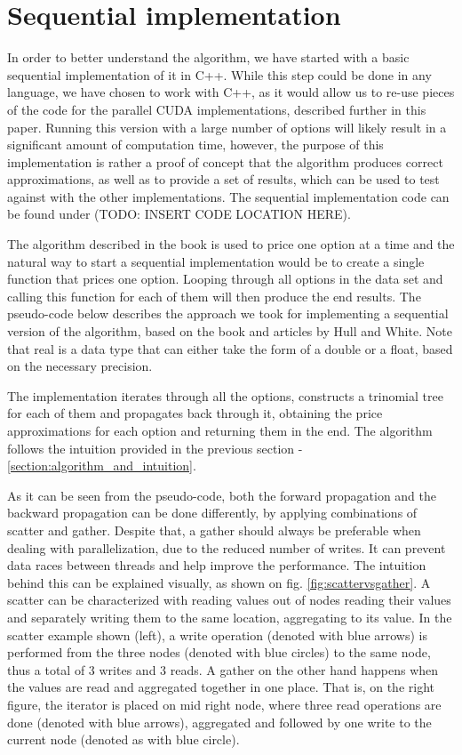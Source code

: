 \chapter{Sequential implementation}
\label{sequential}
In order to better understand the algorithm, we have started with a basic sequential implementation of it in C++. While this step could be done in any language, we have chosen to work with C++, as it would allow us to re-use pieces of the code for the parallel CUDA implementations, described further in this paper. Running this version with a large number of options will likely result in a significant amount of computation time, however, the purpose of this implementation is rather a proof of concept that the algorithm produces correct approximations, as well as to provide a set of results, which can be used to test against with the other implementations. The sequential implementation code can be found under (TODO: INSERT CODE LOCATION HERE).

The algorithm described in the book is used to price one option at a time and the natural way to start a sequential implementation would be to create a single function that prices one option. Looping through all options in the data set and calling this function for each of them will then produce the end results. The pseudo-code below describes the approach we took for implementing a sequential version of the algorithm, based on the book and articles by Hull and White. Note that real is a data type that can either take the form of a double or a float, based on the necessary precision.

The implementation iterates through all the options, constructs a trinomial tree for each of them and propagates back through it, obtaining the price approximations for each option and returning them in the end. The algorithm follows the intuition provided in the previous section - \ref{section:algorithm_and_intuition}.
    
As it can be seen from the pseudo-code, both the forward propagation and the backward propagation can be done differently, by applying combinations of scatter and gather. Despite that, a gather should always be preferable when dealing with parallelization, due to the reduced number of writes. It can prevent data races between threads and help improve the performance. The intuition behind this can be explained visually, as shown on fig. \ref{fig:scattervsgather}. A scatter can be characterized with reading values out of nodes reading their values and separately writing them to the same location, aggregating to its value. In the scatter example shown (left), a write operation (denoted with blue arrows) is performed from the three nodes (denoted with blue circles) to the same node, thus a total of 3 writes and 3 reads. A gather on the other hand happens when the values are read and aggregated together in one place. That is, on the right figure, the iterator is placed on mid right node, where three read operations are done (denoted with blue arrows), aggregated and followed by one write to the current node (denoted as with blue circle).

